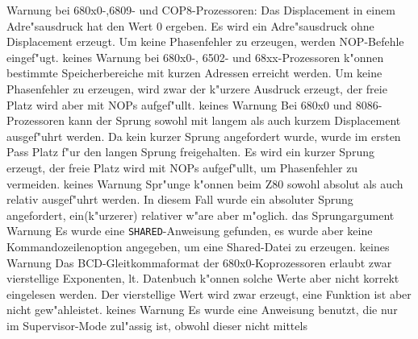 \documentclass[12pt,a4paper,twoside]{report}
\newcommand{\tty}[1]{{\tt #1}}
\begin{document}
\begin{description}
               {Warnung}
               {bei 680x0-,6809- und COP8-Prozessoren: Das Displacement
                in einem Adre"sausdruck hat den Wert 0 ergeben.  Es wird
                ein  Adre"sausdruck  ohne Displacement erzeugt.  Um keine
                Phasenfehler zu erzeugen, werden NOP-Befehle eingef"ugt.}
               {keines}
               {Warnung}
               {bei 680x0-, 6502- und 68xx-Prozessoren k"onnen
                bestimmte Speicherbereiche mit kurzen Adressen erreicht
                werden.  Um keine Phasenfehler zu erzeugen, wird zwar der
                k"urzere Ausdruck erzeugt, der freie Platz wird aber mit
                NOPs aufgef"ullt.}
               {keines}
               {Warnung}
               {Bei 680x0 und 8086-Prozessoren kann der Sprung
                sowohl mit langem als auch kurzem Displacement ausgef"uhrt
                werden.  Da kein kurzer Sprung angefordert wurde, wurde im
                ersten Pass Platz f"ur den langen Sprung freigehalten.
                Es wird ein kurzer Sprung erzeugt, der freie Platz wird
                mit NOPs aufgef"ullt, um Phasenfehler zu vermeiden.}
               {keines}
               {Warnung}
               {Spr"unge k"onnen beim Z80 sowohl absolut als auch relativ
                ausgef"uhrt werden.  In diesem Fall wurde ein absoluter
                Sprung angefordert, ein(k"urzerer) relativer w"are aber
                m"oglich.}
               {das Sprungargument}
               {Warnung}
               {Es wurde eine \tty{SHARED}-Anweisung gefunden, es
                wurde aber keine Kommandozeilenoption angegeben, um eine
                Shared-Datei zu erzeugen.}
               {keines}
               {Warnung}
               {Das BCD-Gleitkommaformat der 680x0-Koprozessoren
                erlaubt zwar vierstellige Exponenten, lt. Datenbuch
                k"onnen solche Werte aber nicht korrekt eingelesen werden.
                Der vierstellige Wert wird zwar erzeugt, eine Funktion ist
                aber nicht gew"ahleistet.}
               {keines}
               {Warnung}
               {Es wurde eine Anweisung benutzt, die nur im
                Supervisor-Mode zul"assig ist, obwohl dieser nicht mittels
}
\end{description}
\end{document}
